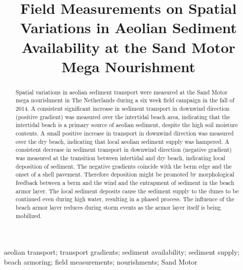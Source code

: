 \documentclass[preprint,12pt,authoryear,a4paper]{elsarticle}
\begin{document}
\begin{frontmatter}

  \title{Field Measurements on Spatial Variations in Aeolian Sediment
    Availability at the Sand Motor Mega Nourishment}

%  
%  
%  

  \begin{abstract}
    Spatial variations in aeolian sediment transport were measured at
    the Sand Motor mega nourishment in The Netherlands during a six
    week field campaign in the fall of 2014. A consistent significant
    increase in sediment transport in downwind direction (positive
    gradient) was measured over the intertidal beach area, indicating
    that the intertidal beach is a primary source of aeolian sediment,
    despite the high soil moisture contents. A small positive increase
    in transport in downwind direction was measured over the dry
    beach, indicating that local aeolian sediment supply was
    hampered. A consistent decrease in sediment transport in downwind
    direction (negative gradient) was measured at the transition
    between intertidal and dry beach, indicating local deposition of
    sediment. The negative gradients coincide with the berm edge and
    the onset of a shell pavement. Therefore deposition might be
    promoted by morphological feedback between a berm and the wind and
    the entrapment of sediment in the beach armor layer. The local
    sediment deposits cause the sediment supply to the dunes to be
    continued even during high water, resulting in a phased
    process. The influence of the beach armor layer reduces during
    storm events as the armor layer itself is being
    mobilized.
  \end{abstract}

  \begin{keyword}
    aeolian transport; transport gradients; sediment availability;
    sediment supply; beach armoring; field measurements; nourishments;
    Sand Motor
  \end{keyword}

\end{frontmatter}
\end{document}
